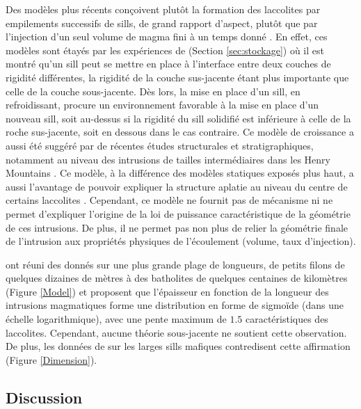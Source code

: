 Des modèles plus récents conçoivent plutôt la formation des laccolites
par empilements successifs de sills, de grand rapport d'aspect, plutôt
que par  l'injection d'un seul volume  de magma fini à  un temps donné
\citep{Menand:2011ki}.   En effet,  ces  modèles sont  étayés par  les
expériences de \citet{Kavanagh:2006ig} (Section \ref{sec:stockage}) où
il est montré  qu'un sill peut se mettre en  place à l'interface entre
deux  couches  de  rigidité  différentes, la  rigidité  de  la  couche
sus-jacente   étant   plus  importante   que   celle   de  la   couche
sous-jacente. Dès lors, la mise  en place d'un sill, en refroidissant,
procure un  environnement favorable  à la mise  en place  d'un nouveau
sill, soit au-dessus si la rigidité du sill solidifié est inférieure à
celle  de  la   roche  sus-jacente,  soit  en  dessous   dans  le  cas
contraire. Ce modèle de croissance a aussi été suggéré par de récentes
études  structurales  et  stratigraphiques, notamment  au  niveau  des
intrusions  de   tailles  intermédiaires  dans  les   Henry  Mountains
\citep{Horsman:2005ct,Morgan:2008hj,Horsman:2009gea,Menand:2011ki}. Ce
modèle, à  la différence  des modèles statiques  exposés plus  haut, a
aussi l'avantage de  pouvoir expliquer la structure  aplatie au niveau
du centre de certains laccolites \citep{Morgan:2008hj}.  Cependant, ce
modèle ne fournit pas de  mécanisme ni ne permet d'expliquer l'origine
de  la  loi  de  puissance  caractéristique de  la  géométrie  de  ces
intrusions. De plus, il ne permet  pas non plus de relier la géométrie
finale  de  l'intrusion  aux   propriétés  physiques  de  l'écoulement
(volume, taux d'injection).

\citet{Nachwuchskoechin:2002tv}  ont réuni  des  donnés  sur une  plus
grande plage  de longueurs, de  petits filons de quelques  dizaines de
mètres à  des batholites de  quelques centaines de  kilomètres (Figure
\ref{Model}) et proposent  que l'épaisseur en fonction  de la longueur
des intrusions magmatiques forme une distribution en forme de sigmoïde
(dans  une échelle  logarithmique), avec  une pente  maximum de  $1.5$
caractéristiques   des   laccolites.     Cependant,   aucune   théorie
sous-jacente ne soutient  cette observation.  De plus,  les données de
\citet{Cruden:tg}  sur les  larges sills  mafiques contredisent  cette
affirmation (Figure \ref{Dimension}).


\subsection{Discussion}
\label{sec:conclusion}

